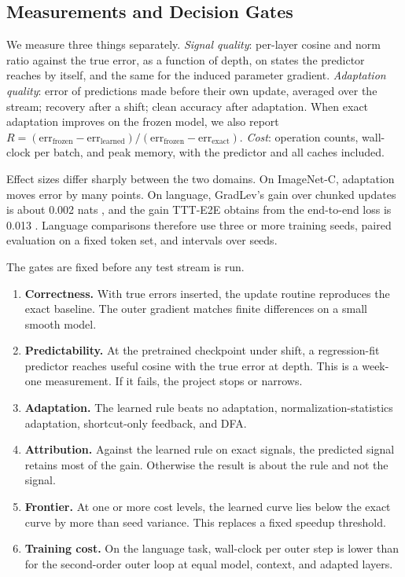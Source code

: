 \documentclass{article}
\begin{document}
\subsection{Measurements and Decision Gates}
\label{sec:gates}

We measure three things separately. \emph{Signal quality}: per-layer cosine and
norm ratio against the true error, as a function of depth, on states the
predictor reaches by itself, and the same for the induced parameter gradient.
\emph{Adaptation quality}: error of predictions made before their own update,
averaged over the stream; recovery after a shift; clean accuracy after
adaptation. When exact adaptation improves on the frozen model, we also report
$R = (\text{err}_\text{frozen} - \text{err}_\text{learned}) /
(\text{err}_\text{frozen} - \text{err}_\text{exact})$. \emph{Cost}: operation
counts, wall-clock per batch, and peak memory, with the predictor and all
caches included.

Effect sizes differ sharply between the two domains. On ImageNet-C, adaptation
moves error by many points. On language, GradLev's gain over chunked updates is
about 0.002 nats \parencite{liu2026gradlev}, and the gain TTT-E2E obtains from
the end-to-end loss is 0.013 \parencite{tandon2025ttte2e}. Language
comparisons therefore use three or more training seeds, paired evaluation on a
fixed token set, and intervals over seeds.

The gates are fixed before any test stream is run.

\begin{enumerate}
\item \textbf{Correctness.} With true errors inserted, the update routine
reproduces the exact baseline. The outer gradient matches finite differences on
a small smooth model.
\item \textbf{Predictability.} At the pretrained checkpoint under shift, a
regression-fit predictor reaches useful cosine with the true error at depth.
This is a week-one measurement. If it fails, the project stops or narrows.
\item \textbf{Adaptation.} The learned rule beats no adaptation,
normalization-statistics adaptation, shortcut-only feedback, and DFA.
\item \textbf{Attribution.} Against the learned rule on exact signals, the
predicted signal retains most of the gain. Otherwise the result is about the
rule and not the signal.
\item \textbf{Frontier.} At one or more cost levels, the learned curve lies
below the exact curve by more than seed variance. This replaces a fixed speedup
threshold.
\item \textbf{Training cost.} On the language task, wall-clock per outer step
is lower than for the second-order outer loop at equal model, context, and
adapted layers.
\end{enumerate}
\end{document}
